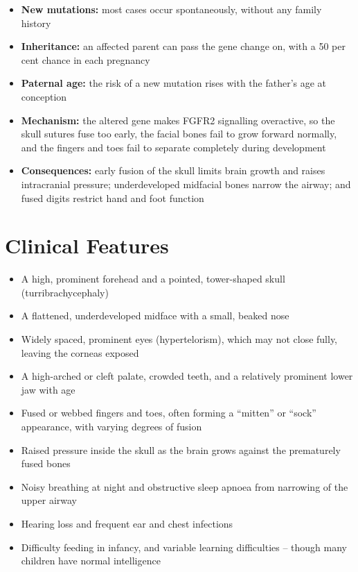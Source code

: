 \begin{itemize}
    \item \textbf{New mutations:} most cases occur spontaneously, without any family history
    \item \textbf{Inheritance:} an affected parent can pass the gene change on, with a 50 per cent chance in each pregnancy
    \item \textbf{Paternal age:} the risk of a new mutation rises with the father's age at conception
    \item \textbf{Mechanism:} the altered gene makes FGFR2 signalling overactive, so the skull sutures fuse too early, the facial bones fail to grow forward normally, and the fingers and toes fail to separate completely during development
    \item \textbf{Consequences:} early fusion of the skull limits brain growth and raises intracranial pressure; underdeveloped midfacial bones narrow the airway; and fused digits restrict hand and foot function
\end{itemize}

\section*{Clinical Features}
\begin{itemize}
    \item A high, prominent forehead and a pointed, tower-shaped skull (turribrachycephaly)
    \item A flattened, underdeveloped midface with a small, beaked nose
    \item Widely spaced, prominent eyes (hypertelorism), which may not close fully, leaving the corneas exposed
    \item A high-arched or cleft palate, crowded teeth, and a relatively prominent lower jaw with age
    \item Fused or webbed fingers and toes, often forming a ``mitten'' or ``sock'' appearance, with varying degrees of fusion
    \item Raised pressure inside the skull as the brain grows against the prematurely fused bones
    \item Noisy breathing at night and obstructive sleep apnoea from narrowing of the upper airway
    \item Hearing loss and frequent ear and chest infections
    \item Difficulty feeding in infancy, and variable learning difficulties -- though many children have normal intelligence
\end{itemize}

